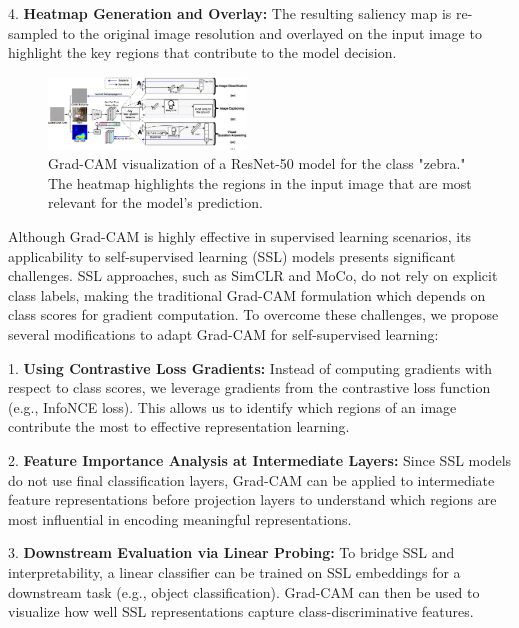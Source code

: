 4. \textbf{Heatmap Generation and Overlay:} The resulting saliency map is re-sampled to the original image resolution and overlayed on the input image to highlight the key regions that contribute to the model decision.

\begin{figure}[h]
    \centering
    \includegraphics[width=0.47\textwidth]{./images/Grad-CAM_approach.png}
    \caption{Grad-CAM visualization of a ResNet-50 model for the class "zebra." The heatmap highlights the regions in the input image that are most relevant for the model's prediction.}
    \label{fig:gradcam}
\end{figure}


Although Grad-CAM is highly effective in supervised learning scenarios, its applicability to self-supervised learning (SSL) models presents significant challenges. SSL approaches, such as SimCLR and MoCo, do not rely on explicit class labels, making the traditional Grad-CAM formulation which depends on class scores for gradient computation. To overcome these challenges, we propose several modifications to adapt Grad-CAM for self-supervised learning:

1. \textbf{Using Contrastive Loss Gradients:} Instead of computing gradients with respect to class scores, we leverage gradients from the contrastive loss function (e.g., InfoNCE loss). This allows us to identify which regions of an image contribute the most to effective representation learning.

2. \textbf{Feature Importance Analysis at Intermediate Layers:} Since SSL models do not use final classification layers, Grad-CAM can be applied to intermediate feature representations before projection layers to understand which regions are most influential in encoding meaningful representations.

3. \textbf{Downstream Evaluation via Linear Probing:} To bridge SSL and interpretability, a linear classifier can be trained on SSL embeddings for a downstream task (e.g., object classification). Grad-CAM can then be used to visualize how well SSL representations capture class-discriminative features.

